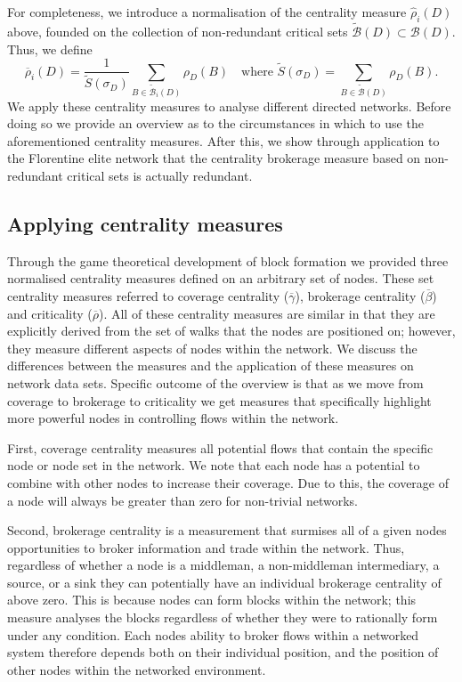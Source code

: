 For completeness, we introduce a normalisation of the centrality measure $\widehat{\rho}_i (D)$ above, founded on the collection of non-redundant critical sets $\widetilde{\mathcal{B}} (D) \subset \mathcal{B} (D)$. Thus, we define
\begin{equation}
\overline{\rho}_i (D) = \frac{1}{\widetilde{S} (\sigma_D)} \sum_{B \in \widetilde{\mathcal{B}}_i (D)} \rho_D (B) \quad \mbox{where } \widetilde{S} (\sigma_D) = \sum_{B \in \widetilde{\mathcal{B}} (D)} \rho_D (B) .
\end{equation}
We apply these centrality measures to analyse different directed networks. Before doing so we provide an overview as to the circumstances in which to use the aforementioned centrality measures. After this, we show through application to the Florentine elite network that the centrality brokerage measure based on non-redundant critical sets is actually redundant.

\subsection{Applying centrality measures}

Through the game theoretical development of block formation we provided three normalised centrality measures defined on an arbitrary set of nodes. These set centrality measures referred to coverage centrality ($\overline{\gamma}$), brokerage centrality ($\overline{\beta}$) and criticality ($\overline{\rho}$). All of these centrality measures are similar in that they are explicitly derived from the set of walks that the nodes are positioned on; however, they measure different aspects of nodes within the network. We discuss the differences between the measures and the application of these measures on network data sets. Specific outcome of the overview is that as we move from coverage to brokerage to criticality we get measures that specifically highlight more powerful nodes in controlling flows within the network.

First, coverage centrality measures all potential flows that contain the specific node or node set in the network. We note that each node has a potential to combine with other nodes to increase their coverage. Due to this, the coverage of a node will always be greater than zero for non-trivial networks.

Second, brokerage centrality is a measurement that surmises all of a given nodes opportunities to broker information and trade within the network. Thus, regardless of whether a node is a middleman, a non-middleman intermediary, a source, or a sink they can potentially have an individual brokerage centrality of above zero. This is because nodes can form blocks within the network; this measure analyses the blocks regardless of whether they were to rationally form under any condition. Each nodes ability to broker flows within a networked system therefore depends both on their individual position, and the position of other nodes within the networked environment.

